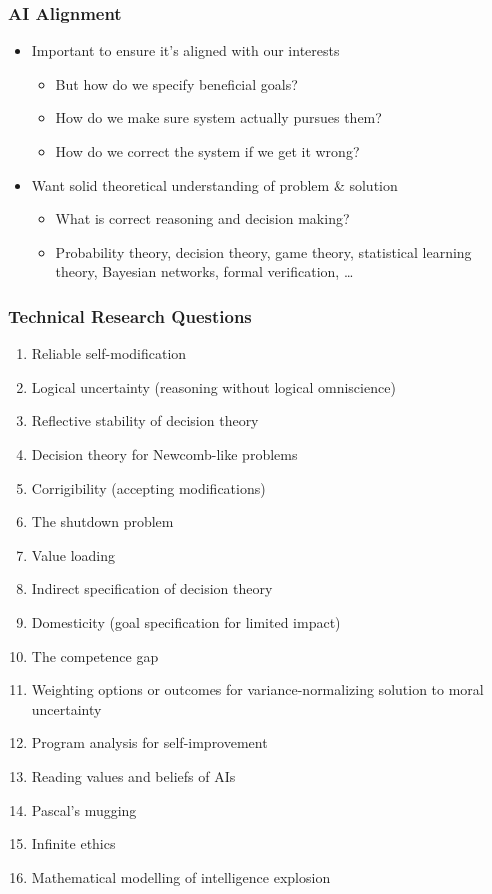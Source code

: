 \documentclass[UTF8,11pt,colorlinks,compress,openany]{beamer}%
\begin{document}
\begin{frame}\frametitle{AI Alignment}
\begin{itemize}
	\item Important to ensure it's aligned with our interests
		\begin{itemize}
			\item But how do we specify beneficial goals?
			\item How do we make sure system actually pursues them?
			\item How do we correct the system if we get it wrong?
		\end{itemize}
	\item Want solid theoretical understanding of problem \& solution
		\begin{itemize}
			\item What is correct reasoning and decision making?
			\item Probability theory, decision theory, game theory, statistical learning theory, Bayesian networks, formal verification, \dots
		\end{itemize}
\end{itemize}
\end{frame}

\begin{frame}\frametitle{Technical Research Questions}
\begin{enumerate}
	\item Reliable self-modification
	\item Logical uncertainty (reasoning without logical omniscience)
	\item Reflective stability of decision theory
	\item Decision theory for Newcomb-like problems
	\item Corrigibility (accepting modifications)
	\item The shutdown problem
	\item Value loading
	\item Indirect specification of decision theory
	\item Domesticity (goal specification for limited impact)
	\item The competence gap
	\item Weighting options or outcomes for variance-normalizing solution to moral uncertainty
	\item Program analysis for self-improvement
	\item Reading values and beliefs of AIs
	\item Pascal's mugging
	\item Infinite ethics
	\item Mathematical modelling of intelligence explosion
\end{enumerate}
\end{frame}
\end{document}
